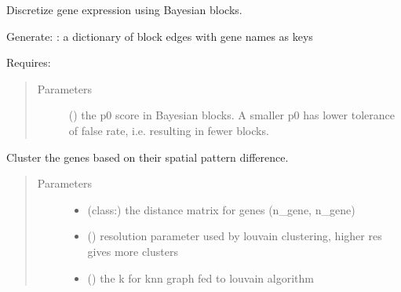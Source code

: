 \documentclass[letterpaper,10pt,english]{sphinxmanual}
\begin{document}
\begin{fulllineitems}
\begin{fulllineitems}
\label{\detokenize{api:spaotsc.SpaOTsc.spatial_sc.discretize_expression}}
Discretize gene expression using Bayesian blocks.

Generate: : a dictionary of block edges with gene names as keys

Requires: 
\begin{quote}\begin{description}
\item[{Parameters}] \leavevmode
{} (\sphinxstyleliteralemphasis{, }) \textendash{} the p0 score in Bayesian blocks. A smaller p0 has lower tolerance of false rate, i.e. resulting in fewer blocks.

\end{description}\end{quote}

\end{fulllineitems}


\begin{fulllineitems}
\label{\detokenize{api:spaotsc.SpaOTsc.spatial_sc.gene_clustering}}
Cluster the genes based on their spatial pattern difference.
\begin{quote}\begin{description}
\item[{Parameters}] \leavevmode\begin{itemize}
\item {} 
 (class:) \textendash{} the distance matrix  for genes (n\_gene, n\_gene)

\item {} 
 (\sphinxstyleliteralemphasis{, }) \textendash{} resolution parameter used by louvain clustering, higher res gives more clusters

\item {} 
 (\sphinxstyleliteralemphasis{, }) \textendash{} the k for knn graph fed to louvain algorithm


\end{itemize}
\end{description}
\end{quote}
\end{fulllineitems}
\end{fulllineitems}
\end{document}
